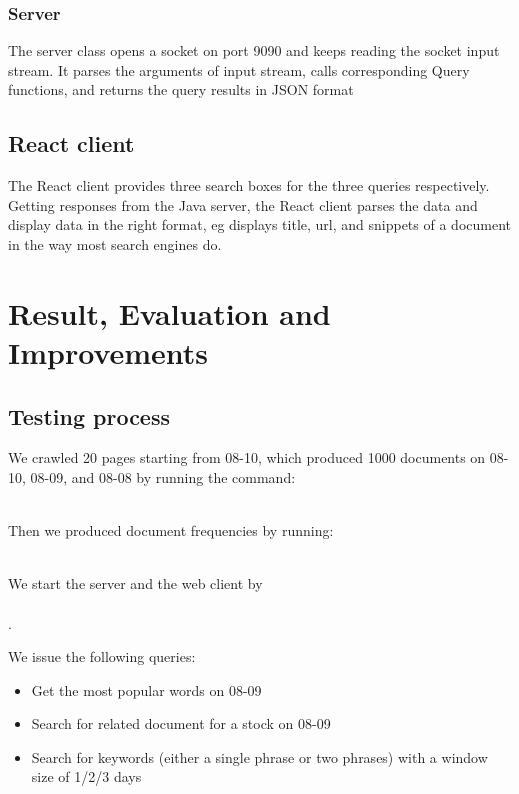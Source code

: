 \documentclass{article}
\begin{document}
\subsubsection{Server}
The server class opens a socket on port 9090 and keeps reading the socket input stream. It parses the arguments of input stream, calls corresponding Query functions, and returns the query results in JSON format

\subsection{React client}
The React client provides three search boxes for the three queries respectively. Getting responses from the Java server, the React client parses the data and display data in the right format, eg displays title, url, and snippets of a document in the way most search engines do.  

\section{Result, Evaluation and Improvements}
\subsection{Testing process}
We crawled 20 pages starting from 08-10, which produced 1000 documents on 08-10, 08-09, and 08-08 by running the command: \\ \\
\texttt{}

Then we produced document frequencies by running: \\ \\
\texttt{}
\texttt{}
\texttt{}

We start the server and the web client by \\ \\
  \texttt{}
  \texttt{}.

We issue the following queries: 
    \begin{itemize}
      \item Get the most popular words on 08-09
      \item Search for related document for a stock on 08-09
      \item Search for keywords (either a single phrase or two phrases) with a window size of 1/2/3 days  
    \end{itemize}
\end{document}
